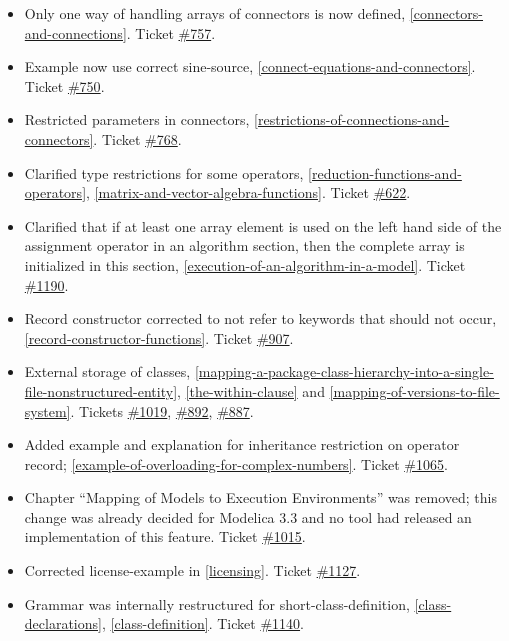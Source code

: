 \begin{itemize}
\item
  Only one way of handling arrays of connectors is now defined,
  \autoref{connectors-and-connections}. Ticket \href{https://github.com/modelica/ModelicaSpecification/issues/757}{\#757}.
\item
  Example now use correct sine-source, \autoref{connect-equations-and-connectors}. Ticket
  \href{https://github.com/modelica/ModelicaSpecification/issues/750}{\#750}.
\item
  Restricted parameters in connectors, \autoref{restrictions-of-connections-and-connectors}. Ticket
  \href{https://github.com/modelica/ModelicaSpecification/issues/768}{\#768}.
\item
  Clarified type restrictions for some operators, \autoref{reduction-functions-and-operators},
  \autoref{matrix-and-vector-algebra-functions}. Ticket
  \href{https://github.com/modelica/ModelicaSpecification/issues/622}{\#622}.
\item
  Clarified that if at least one array element is used on the left hand
  side of the assignment operator in an algorithm section, then the
  complete array is initialized in this section, \autoref{execution-of-an-algorithm-in-a-model}. Ticket
  \href{https://github.com/modelica/ModelicaSpecification/issues/1190}{\#1190}.
\item
  Record constructor corrected to not refer to keywords that should not
  occur, \autoref{record-constructor-functions}. Ticket
  \href{https://github.com/modelica/ModelicaSpecification/issues/907}{\#907}.
\item
  External storage of classes, \autoref{mapping-a-package-class-hierarchy-into-a-single-file-nonstructured-entity},
  \autoref{the-within-clause} and \autoref{mapping-of-versions-to-file-system}.
  Tickets \href{https://github.com/modelica/ModelicaSpecification/issues/1019}{\#1019},
  \href{https://github.com/modelica/ModelicaSpecification/issues/892}{\#892},
  \href{https://github.com/modelica/ModelicaSpecification/issues/887}{\#887}.
\item
  Added example and explanation for inheritance restriction on operator
  record; \autoref{example-of-overloading-for-complex-numbers}. Ticket
  \href{https://github.com/modelica/ModelicaSpecification/issues/1065}{\#1065}.
\item
  Chapter ``Mapping of Models to Execution Environments'' was removed;
  this change was already decided for Modelica 3.3 and no tool had
  released an implementation of this feature. Ticket
  \href{https://github.com/modelica/ModelicaSpecification/issues/1015}{\#1015}.
\item
  Corrected license-example in \autoref{licensing}. Ticket
  \href{https://github.com/modelica/ModelicaSpecification/issues/1127}{\#1127}.
\item
  Grammar was internally restructured for short-class-definition,
  \autoref{class-declarations}, \autoref{class-definition}. Ticket
  \href{https://github.com/modelica/ModelicaSpecification/issues/1140}{\#1140}.
\end{itemize}

